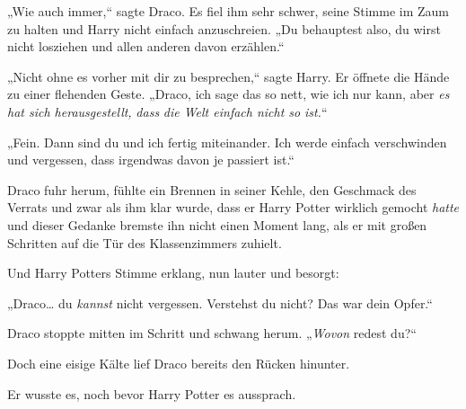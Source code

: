 „Wie auch immer,“ sagte Draco. Es fiel ihm sehr schwer, seine Stimme im Zaum zu halten und Harry nicht einfach anzuschreien. „Du behauptest also, du wirst nicht losziehen und allen anderen davon erzählen.“

„Nicht ohne es vorher mit dir zu besprechen,“ sagte Harry. Er öffnete die Hände zu einer flehenden Geste. „Draco, ich sage das so nett, wie ich nur kann, aber \emph{es hat sich herausgestellt,} \emph{dass} \emph{die Welt einfach nicht so} \emph{ist.}“

„Fein. Dann sind du und ich fertig miteinander. Ich werde einfach verschwinden und vergessen, dass irgendwas davon je passiert ist.“

Draco fuhr herum, fühlte ein Brennen in seiner Kehle, den Geschmack des Verrats und zwar als ihm klar wurde, dass er Harry Potter wirklich gemocht \emph{hatte} und dieser Gedanke bremste ihn nicht einen Moment lang, als er mit großen Schritten auf die Tür des Klassenzimmers zuhielt.

Und Harry Potters Stimme erklang, nun lauter und besorgt:

„Draco… du \emph{kannst} nicht vergessen. Verstehst du nicht? Das war dein Opfer.“

Draco stoppte mitten im Schritt und schwang herum. „\emph{Wovon} redest du?“

Doch eine eisige Kälte lief Draco bereits den Rücken hinunter.

Er wusste es, noch bevor Harry Potter es aussprach.

